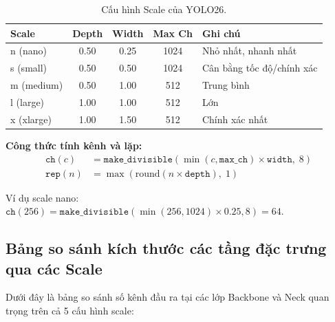 \begin{table}[H]
\centering
\caption{Cấu hình Scale của YOLO26.}
\label{tab:scales}
\begin{tabular}{lcccl}
\toprule
\textbf{Scale} & \textbf{Depth} & \textbf{Width} & \textbf{Max Ch} & \textbf{Ghi chú} \\
\midrule
n (nano)   & 0.50 & 0.25 & 1024 & Nhỏ nhất, nhanh nhất \\
s (small)  & 0.50 & 0.50 & 1024 & Cân bằng tốc độ/chính xác \\
m (medium) & 0.50 & 1.00 & 512  & Trung bình \\
l (large)  & 1.00 & 1.00 & 512  & Lớn \\
x (xlarge) & 1.00 & 1.50 & 512  & Chính xác nhất \\
\bottomrule
\end{tabular}
\end{table}

\textbf{Công thức tính kênh và lặp:}
\begin{align}
    \texttt{ch}(c) &= \texttt{make\_divisible}\left(\min(c, \texttt{max\_ch}) \times \texttt{width},\; 8\right) \label{eq:ch} \\
    \texttt{rep}(n) &= \max\left(\text{round}(n \times \texttt{depth}),\; 1\right) \label{eq:rep}
\end{align}

Ví dụ scale nano: $\texttt{ch}(256) = \texttt{make\_divisible}(\min(256, 1024) \times 0.25, 8) = 64$.

\subsection{Bảng so sánh kích thước các tầng đặc trưng qua các Scale}

Dưới đây là bảng so sánh số kênh đầu ra tại các lớp Backbone và Neck quan trọng trên cả 5 cấu hình scale:

